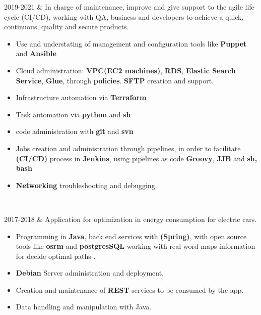 \documentclass[
    changecolor={111, 156, 45}, 
]{cv-roald}
\begin{document}
\begin{tabularcv}
2019-2021    &  
                \newline In charge of maintenance, improve and give support to the agile life cycle (CI/CD), working with QA, business and developers to achieve a quick, continuous, quality and secure products.
                \begin{itemize}
                    \item Use and understating of management and configuration tools like \textbf{Puppet} and \textbf{Ansible}
                    \item Cloud administration: \textbf{VPC(EC2 machines)}, \textbf{RDS}, \textbf{Elastic Search Service}, \textbf{Glue}, through \textbf{policies}. \textbf{SFTP} creation and support.
                    \item Infrastructure automation via \textbf{Terraform}
                    \item Task automation via \textbf{python} and \textbf{sh}
                    \item code administration with \textbf{git} and \textbf{svn}
                    \item Jobs creation and administration through pipelines, in order to facilitate \textbf{(CI/CD)} process in \textbf{Jenkins}, using pipelines as code \textbf{Groovy}, \textbf{JJB} and \textbf{sh, bash}
                    \item \textbf{Networking} troubleshooting and debugging.
                \end{itemize}
                \
\end{tabularcv}

\begin{tabularcv}
2017-2018   &   
                \newline Application for optimization in energy consumption for electric cars.
                \begin{itemize}
                  \item Programming in \textbf{Java}, back end services with \textbf{(Spring)}, with open source tools like  \textbf{osrm} and \textbf{postgresSQL} working with real word maps information for decide optimal paths .
                  \item \textbf{Debian} Server administration and deployment.
                  \item Creation and maintenance of \textbf{REST} services to be consumed by the app.
                  \item Data handling and manipulation with Java.
                \end{itemize} 
\end{tabularcv} 
\end{document}
